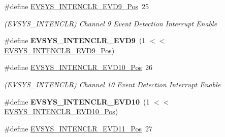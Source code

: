\begin{DoxyCompactItemize}
\item 
\hypertarget{group___s_a_m_l21___e_v_s_y_s_ga2b50eaa4b72ed403723b2965febd9a84}{}\#define \hyperlink{group___s_a_m_l21___e_v_s_y_s_ga2b50eaa4b72ed403723b2965febd9a84}{E\+V\+S\+Y\+S\+\_\+\+I\+N\+T\+E\+N\+C\+L\+R\+\_\+\+E\+V\+D9\+\_\+\+Pos}~25\label{group___s_a_m_l21___e_v_s_y_s_ga2b50eaa4b72ed403723b2965febd9a84}

\begin{DoxyCompactList}\small\item\em (E\+V\+S\+Y\+S\+\_\+\+I\+N\+T\+E\+N\+C\+L\+R) Channel 9 Event Detection Interrupt Enable \end{DoxyCompactList}\item 
\hypertarget{group___s_a_m_l21___e_v_s_y_s_ga48d49311decae6d29f14e12f6bdc2c1d}{}\#define {\bfseries E\+V\+S\+Y\+S\+\_\+\+I\+N\+T\+E\+N\+C\+L\+R\+\_\+\+E\+V\+D9}~(1 $<$$<$ \hyperlink{group___s_a_m_l21___e_v_s_y_s_ga2b50eaa4b72ed403723b2965febd9a84}{E\+V\+S\+Y\+S\+\_\+\+I\+N\+T\+E\+N\+C\+L\+R\+\_\+\+E\+V\+D9\+\_\+\+Pos})\label{group___s_a_m_l21___e_v_s_y_s_ga48d49311decae6d29f14e12f6bdc2c1d}

\item 
\hypertarget{group___s_a_m_l21___e_v_s_y_s_gaf70107c8dc224642cfc2a07320d504c3}{}\#define \hyperlink{group___s_a_m_l21___e_v_s_y_s_gaf70107c8dc224642cfc2a07320d504c3}{E\+V\+S\+Y\+S\+\_\+\+I\+N\+T\+E\+N\+C\+L\+R\+\_\+\+E\+V\+D10\+\_\+\+Pos}~26\label{group___s_a_m_l21___e_v_s_y_s_gaf70107c8dc224642cfc2a07320d504c3}

\begin{DoxyCompactList}\small\item\em (E\+V\+S\+Y\+S\+\_\+\+I\+N\+T\+E\+N\+C\+L\+R) Channel 10 Event Detection Interrupt Enable \end{DoxyCompactList}\item 
\hypertarget{group___s_a_m_l21___e_v_s_y_s_ga838cc68f8cbf2dc2dc3868686990156f}{}\#define {\bfseries E\+V\+S\+Y\+S\+\_\+\+I\+N\+T\+E\+N\+C\+L\+R\+\_\+\+E\+V\+D10}~(1 $<$$<$ \hyperlink{group___s_a_m_l21___e_v_s_y_s_gaf70107c8dc224642cfc2a07320d504c3}{E\+V\+S\+Y\+S\+\_\+\+I\+N\+T\+E\+N\+C\+L\+R\+\_\+\+E\+V\+D10\+\_\+\+Pos})\label{group___s_a_m_l21___e_v_s_y_s_ga838cc68f8cbf2dc2dc3868686990156f}

\item 
\hypertarget{group___s_a_m_l21___e_v_s_y_s_ga02702f3214e3b2febafa300d126a0303}{}\#define \hyperlink{group___s_a_m_l21___e_v_s_y_s_ga02702f3214e3b2febafa300d126a0303}{E\+V\+S\+Y\+S\+\_\+\+I\+N\+T\+E\+N\+C\+L\+R\+\_\+\+E\+V\+D11\+\_\+\+Pos}~27\label{group___s_a_m_l21___e_v_s_y_s_ga02702f3214e3b2febafa300d126a0303}


\end{DoxyCompactItemize}
